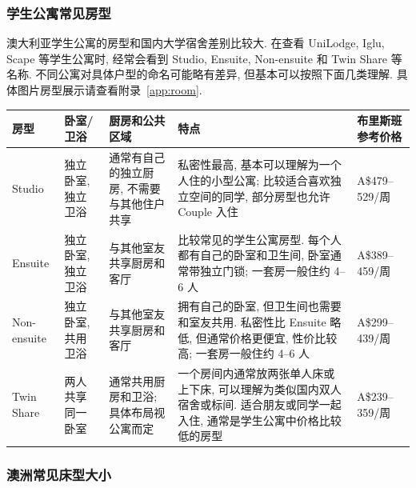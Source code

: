 \documentclass[UTF8,a4paper,12pt]{ctexart}
\newif\ifcourseopen
\newif\ifcourseheaderprinted
\newcounter{courseitem}
\newcommand{\finishcourse}{%
 \ifcourseopen
 \par\end{minipage}\end{tcolorbox}%
 \courseopenfalse
 \fi
}
\newcommand{\coursereset}{\finishcourse\setcounter{courseitem}{0}\courseheaderprintedfalse}
\let\origsubsubsection\subsubsection
\renewcommand{\subsubsection}{\coursereset\origsubsubsection}
\begin{document}
\subsubsection{学生公寓常见房型}

澳大利亚学生公寓的房型和国内大学宿舍差别比较大. 在查看 UniLodge, Iglu, Scape 等学生公寓时, 经常会看到 Studio, Ensuite, Non-ensuite 和 Twin Share 等名称. 不同公寓对具体户型的命名可能略有差异, 但基本可以按照下面几类理解. 具体图片房型展示请查看附录~\ref{app:room}. 

\scriptsize
\renewcommand{\arraystretch}{1.18}

\begin{longtable}{@{}p{}p{}p{}p{}p{}@{}}

\toprule

房型 & 卧室/卫浴 & 厨房和公共区域 & 特点 & 布里斯班参考价格 \\

\midrule

\endhead

\bottomrule

\endfoot

Studio & 独立卧室, 独立卫浴 & 通常有自己的独立厨房, 不需要与其他住户共享 & 私密性最高, 基本可以理解为一个人住的小型公寓; 比较适合喜欢独立空间的同学, 部分房型也允许 Couple 入住 & A\$479--529/周 \\

Ensuite & 独立卧室, 独立卫浴 & 与其他室友共享厨房和客厅 & 比较常见的学生公寓房型. 每个人都有自己的卧室和卫生间, 卧室通常带独立门锁; 一套房一般住约 4--6 人 & A\$389--459/周 \\

Non-ensuite & 独立卧室, 共用卫浴 & 与其他室友共享厨房和客厅 & 拥有自己的卧室, 但卫生间也需要和室友共用. 私密性比 Ensuite 略低, 但通常价格更便宜, 性价比较高; 一套房一般住约 4--6 人 & A\$299--439/周 \\

Twin Share & 两人共享同一卧室 & 通常共用厨房和卫浴; 具体布局视公寓而定 & 一个房间内通常放两张单人床或上下床, 可以理解为类似国内双人宿舍或标间. 适合朋友或同学一起入住, 通常是学生公寓中价格比较低的房型 & A\$239--359/周 \\

\end{longtable}

\normalsize

\subsubsection{澳洲常见床型大小}
\end{document}
